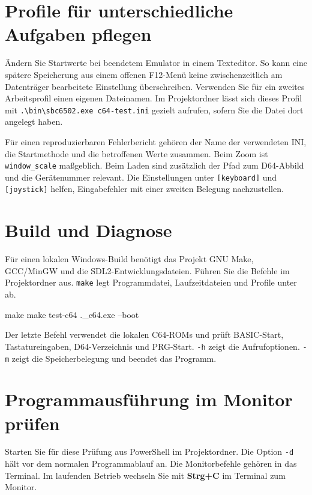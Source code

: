 \documentclass[fontsize=10.2bp,DIV=calc,oneside,open=any,headings=normal,numbers=noenddot]{scrbook}
\newcommand{\ui}[1]{\textbf{#1}}
\begin{document}
\section{Profile für unterschiedliche Aufgaben pflegen}
Ändern Sie Startwerte bei beendetem Emulator in einem Texteditor. So kann eine
spätere Speicherung aus einem offenen F12-Menü keine zwischenzeitlich am
Datenträger bearbeitete Einstellung überschreiben. Verwenden Sie für ein
zweites Arbeitsprofil einen eigenen Dateinamen. Im Projektordner lässt sich
dieses Profil mit \texttt{.\textbackslash bin\textbackslash sbc6502.exe c64-test.ini}
gezielt aufrufen, sofern Sie die Datei dort angelegt haben.

Für einen reproduzierbaren Fehlerbericht gehören der Name der verwendeten
INI, die Startmethode und die betroffenen Werte zusammen. Beim Zoom ist
\texttt{window\_scale} maßgeblich. Beim Laden sind zusätzlich der Pfad zum
D64-Abbild und die Gerätenummer relevant. Die Einstellungen unter
\texttt{[keyboard]} und \texttt{[joystick]} helfen, Eingabefehler mit einer
zweiten Belegung nachzustellen.

\section{Build und Diagnose}
Für einen lokalen Windows-Build benötigt das Projekt GNU Make, GCC/MinGW und
die SDL2-Entwicklungsdateien. Führen Sie die Befehle im Projektordner aus.
\texttt{make} legt Programmdatei, Laufzeitdateien und Profile unter  ab.

\begin{commandblock}
make
make test-c64
.\build\test_c64.exe --boot
\end{commandblock}

Der letzte Befehl verwendet die lokalen C64-ROMs und prüft BASIC-Start,
Tastatureingaben, D64-Verzeichnis und PRG-Start. \texttt{-h} zeigt die
Aufrufoptionen. \texttt{-m} zeigt die Speicherbelegung und beendet das Programm.

\clearpage
\section{Programmausführung im Monitor prüfen}\label{sec:monitor}
Starten Sie für diese Prüfung aus PowerShell im Projektordner. Die Option
\texttt{-d} hält vor dem normalen Programmablauf an. Die Monitorbefehle
gehören in das Terminal. Im laufenden Betrieb wechseln Sie mit
\ui{Strg+C} im Terminal zum Monitor.
\end{document}
